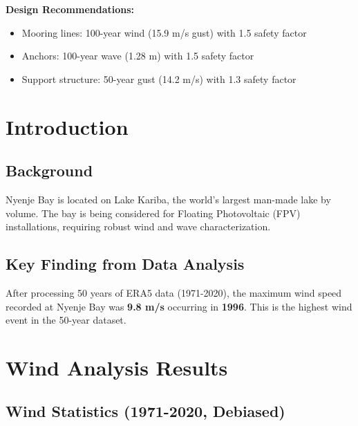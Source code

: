 \documentclass[12pt]{article}
\begin{document}
\vspace{0.5cm}

\textbf{Design Recommendations:}
\begin{itemize}
    \item Mooring lines: 100-year wind (15.9 m/s gust) with 1.5 safety factor
    \item Anchors: 100-year wave (1.28 m) with 1.5 safety factor
    \item Support structure: 50-year gust (14.2 m/s) with 1.3 safety factor
\end{itemize}

\newpage

\section{Introduction}

\subsection{Background}
Nyenje Bay is located on Lake Kariba, the world's largest man-made lake by volume. The bay is being considered for Floating Photovoltaic (FPV) installations, requiring robust wind and wave characterization.

\subsection{Key Finding from Data Analysis}
After processing 50 years of ERA5 data (1971-2020), the maximum wind speed recorded at Nyenje Bay was \textbf{9.8 m/s} occurring in \textbf{1996}. This is the highest wind event in the 50-year dataset.

\newpage

\section{Wind Analysis Results}

\subsection{Wind Statistics (1971-2020, Debiased)}
\end{document}
